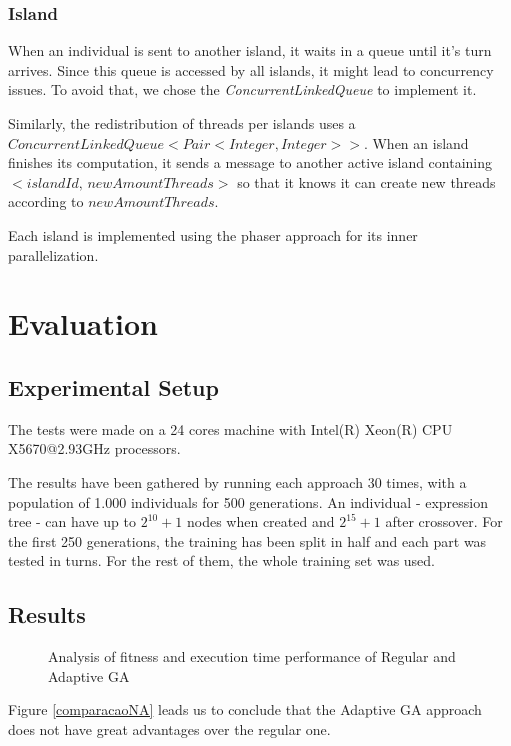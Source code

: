 \documentclass[runningheads]{llncs}
\begin{document}
\subsubsection{Island} \hfill \par

When an individual is sent to another island, it waits in a queue until it's turn arrives. Since this queue is accessed by all islands, it might lead to concurrency issues. To avoid that, we chose the \emph{ConcurrentLinkedQueue} to implement it.

Similarly, the redistribution of threads per islands uses a \(ConcurrentLinkedQueue<Pair<Integer, Integer>>\). When an island finishes its computation, it sends a message to another active island containing \(<islandId, \,newAmountThreads>\) so that it knows it can create new threads according to $newAmountThreads$.

Each island is implemented using the phaser approach for its inner parallelization.

\section{Evaluation}

\subsection{Experimental Setup}
The tests were made on a 24 cores machine with Intel(R) Xeon(R) CPU X5670@2.93GHz processors.

The results have been gathered by running each approach 30 times, with a population of 1.000 individuals for 500 generations. An individual - expression tree - can have up to \(2^{10} + 1\) nodes when created and \(2^{15} + 1\) after crossover. For the first 250 generations, the training has been split in half and each part was tested in turns. For the rest of them, the whole training set was used.

\subsection{Results}
\begin{figure}[H]
\centering
{}%
\qquad
{}%
\caption{Analysis of fitness and execution time performance of Regular and Adaptive GA} \label{comparacaoNA}
\label{comparacaoImpl}%
\end{figure}
Figure \ref{comparacaoNA} leads us to conclude that the Adaptive GA approach does not have great advantages over the regular one.
\end{document}
